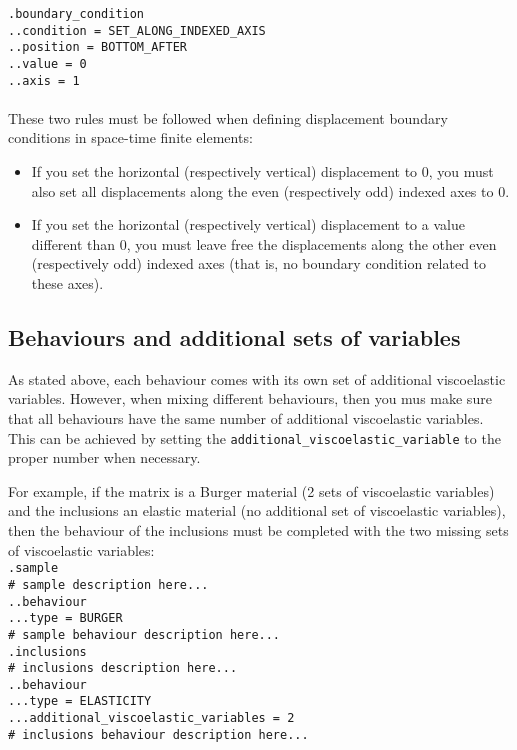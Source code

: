 \documentclass[10pt]{article}
\begin{document}
\noindent \verb+.boundary_condition+\\
\verb+..condition = SET_ALONG_INDEXED_AXIS+\\
\verb+..position = BOTTOM_AFTER+\\
\verb+..value = 0+\\
\verb+..axis = 1+

\paragraph{} These two rules must be followed when defining displacement boundary conditions in space-time finite elements:

\begin{itemize}
	\item If you set the horizontal (respectively vertical) displacement to 0, you must also set all displacements along the even (respectively odd) indexed axes to 0.
	\item If you set the horizontal (respectively vertical) displacement to a value different than 0, you must leave free the displacements along the other even (respectively odd) indexed axes (that is, no boundary condition related to these axes).
\end{itemize}

\subsection{Behaviours and additional sets of variables}

As stated above, each behaviour comes with its own set of additional viscoelastic variables. However, when mixing different behaviours, then you mus make sure that all behaviours have the same number of additional viscoelastic variables. This can be achieved by setting the \verb+additional_viscoelastic_variable+ to the proper number when necessary.

For example, if the matrix is a Burger material (2 sets of viscoelastic variables) and the inclusions an elastic material (no additional set of viscoelastic variables), then the behaviour of the inclusions must be completed with the two missing sets of viscoelastic variables:\\

\noindent \verb+.sample+\\
\verb+# sample description here...+\\
\verb+..behaviour+\\
\verb+...type = BURGER+\\
\verb+# sample behaviour description here...+\\
\verb+.inclusions+\\
\verb+# inclusions description here...+\\
\verb+..behaviour+\\
\verb+...type = ELASTICITY+\\
\verb+...additional_viscoelastic_variables = 2+\\
\verb+# inclusions behaviour description here...+
\end{document}
